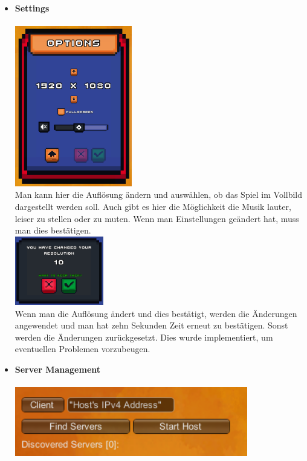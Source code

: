 \begin{itemize}
\begin {itemize}
            Es gibt die Möglichkeit die Credits vorzeitig zu Verlassen. Dies geschieht durch das Drücken des Knopfes mit dem Haus als Icon. Die Tester fanden dies auch sehr intuitiv.
        \item \textbf{Settings}\\
            \\
            \includegraphics*[height=7cm]{resources/setting.png}\\
            Man kann hier die Auflösung ändern und auswählen, ob das Spiel im Vollbild dargestellt werden soll. Auch gibt es hier die Möglichkeit die Musik lauter, leiser zu stellen
            oder zu muten. Wenn man Einstellungen geändert hat, muss man dies bestätigen. \\
            \includegraphics*[height=3cm]{resources/resolution.png}\\
            Wenn man die Auflösung ändert und dies bestätigt, werden die Änderungen angewendet und man hat zehn Sekunden Zeit erneut zu bestätigen. Sonst werden die Änderungen zurückgesetzt.
            Dies wurde implementiert, um eventuellen Problemen vorzubeugen. 
        \item \textbf{Server Management}\\
            \\
            \includegraphics*[height = 3cm]{resources/server.png}\\

\end{itemize}
\end{itemize}
